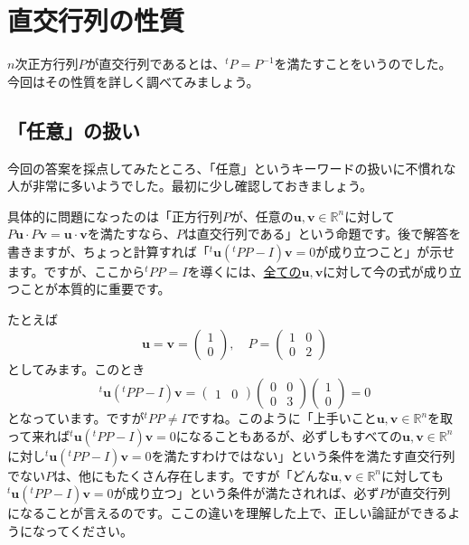 \chapter{直交行列の性質}

$n$次正方行列$P$が直交行列であるとは、${}^t\!P = P^{-1}$を満たすことをいうのでした。今回はその性質を詳しく調べてみましょう。

\section{「任意」の扱い}

今回の答案を採点してみたところ、「任意」というキーワードの扱いに不慣れな人が非常に多いようでした。最初に少し確認しておきましょう。

具体的に問題になったのは「正方行列$P$が、任意の$\bm{u}, \bm{v} \in \mathbb{R}^n$に対して$P\bm{u} \cdot P\bm{v} = \bm{u} \cdot \bm{v}$を満たすなら、$P$は直交行列である」という命題です。後で解答を書きますが、ちょっと計算すれば「${}^t\bm{u} ({}^tPP - I) \bm{v} = 0$が成り立つこと」が示せます。ですが、ここから${}^tP P = I$を導くには、\uline{全ての}$\bm{u}, \bm{v}$に対して今の式が成り立つことが本質的に重要です。

たとえば
\[
\bm{u} = \bm{v} =
\begin{pmatrix}
1 \\
0
\end{pmatrix}, \quad
P = 
\begin{pmatrix}
1 & 0 \\
0 & 2
\end{pmatrix}
\]
としてみます。このとき
\[
{}^t \bm{u} ({}^tPP - I) \bm{v}
= 
\begin{pmatrix}
1 & 0
\end{pmatrix}
\begin{pmatrix}
0 & 0 \\
0 & 3
\end{pmatrix}
\begin{pmatrix}
1 \\
0
\end{pmatrix}
= 0
\]
となっています。ですが${}^tPP \neq I$ですね。このように「上手いこと$\bm{u}, \bm{v} \in \mathbb{R}^n$を取って来れば${}^t\bm{u}({}^tP P - I)\bm{v} = 0$になることもあるが、必ずしもすべての$\bm{u}, \bm{v} \in \mathbb{R}^n$に対し${}^t\bm{u}({}^tP P - I)\bm{v} = 0$を満たすわけではない」という条件を満たす直交行列でない$P$は、他にもたくさん存在します。ですが「どんな$\bm{u}, \bm{v} \in \mathbb{R}^n$に対しても${}^t\bm{u}({}^tP P - I)\bm{v} = 0$が成り立つ」という条件が満たされれば、必ず$P$が直交行列になることが言えるのです。ここの違いを理解した上で、正しい論証ができるようになってください。

